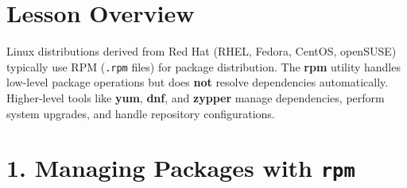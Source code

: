 \documentclass[a4paper]{report}
\begin{document}
\section*{Lesson Overview}

Linux distributions derived from Red Hat (RHEL, Fedora, CentOS, openSUSE) typically use RPM (\texttt{.rpm} files) for package distribution. The \textbf{rpm} utility handles low-level package operations but does \textbf{not} resolve dependencies automatically. Higher-level tools like \textbf{yum}, \textbf{dnf}, and \textbf{zypper} manage dependencies, perform system upgrades, and handle repository configurations.

\section*{1. Managing Packages with \texttt{rpm}}
\end{document}
